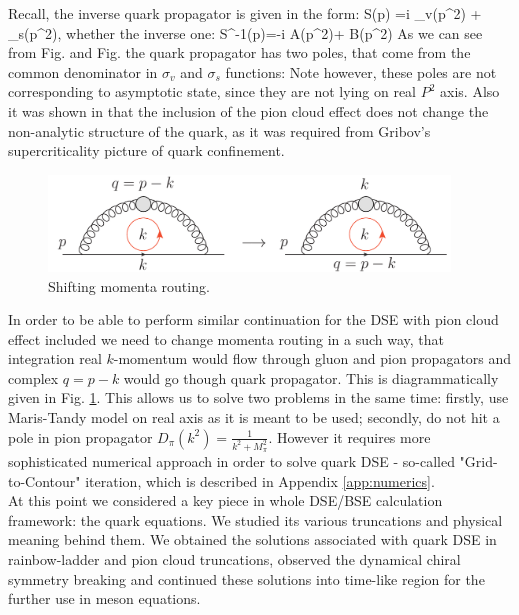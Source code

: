 Recall, the inverse quark propagator is given in the form:
\beqa
	S(p) =i \sigma_v(p^2) \pslash + \sigma_s(p^2)\;,
\eeqa
whether the inverse one:
\beqa
	S^{-1}(p)=-i A(p^2)\pslash + B(p^2)
\eeqa
	As we can see from Fig. and Fig. the quark propagator has two poles, that come from the common denominator in $\sigma_v$ and $\sigma_s$ functions:
\beqa
\eeqa
Note however, these poles are not corresponding to asymptotic state, since they are not lying on real $P^2$ axis. Also it was shown in \cite{Fischer:2008sp} that the inclusion of the pion cloud effect does not change the non-analytic structure of the quark, as it was required from Gribov's supercriticality picture of quark confinement.
\begin{figure}[H]
\tiny
 \begin{center}
  \includegraphics[width=0.95\textwidth]{figures/shift_momenta}
 \end{center}
 \caption{\footnotesize Shifting momenta routing. }\label{fig:shift_momenta} 
\end{figure}
	In order to be able to perform similar continuation for the DSE with pion cloud effect included we need to change momenta routing in a such way, that integration real $k$-momentum would flow through gluon and pion propagators and complex $q=p-k$ would go though quark propagator. This is diagrammatically given in Fig. \ref{fig:shift_momenta}. This allows us to solve two problems in the same time: firstly, use Maris-Tandy model on real axis as it is meant to be used; secondly, do not hit a pole in pion propagator $D_\pi(k^2)=\frac{1}{k^2+M^2_\pi}$. However it requires more sophisticated numerical approach in order to solve quark DSE - so-called "Grid-to-Contour" iteration, which is described in Appendix \ref{app:numerics}. \\ 
	
	At this point we considered a key piece in whole DSE/BSE calculation framework: the quark \DS equations. We studied its various truncations and physical meaning behind them. We obtained the solutions associated with quark DSE in rainbow-ladder and pion cloud truncations, observed the dynamical chiral symmetry breaking and continued these solutions into time-like region for the further use in meson \BS equations. 